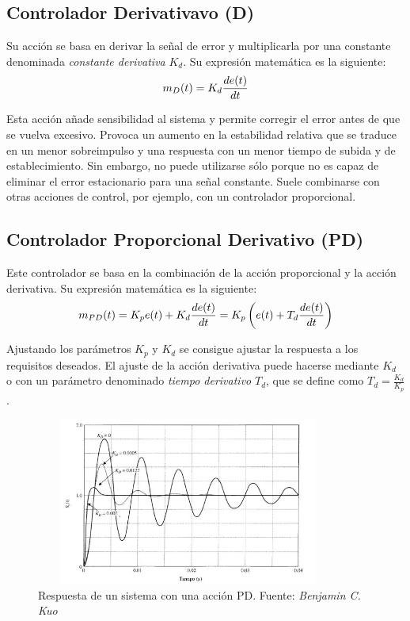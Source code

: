 \subsection{Controlador Derivativavo (D)}

	Su acción se basa en derivar la señal de error y multiplicarla por una constante denominada \textit{constante derivativa} $K_{d}$. Su expresión matemática es la siguiente:
\begin{equation}\label{ecuacion2_4}
\normalsize m_{D}(t) = K_{d}\frac{de(t)}{dt}
\end{equation}

	Esta acción añade sensibilidad al sistema y permite corregir el error antes de que se vuelva excesivo. Provoca un aumento en la estabilidad relativa que se traduce en un menor sobreimpulso y una respuesta con un menor tiempo de subida y de establecimiento. Sin embargo, no puede utilizarse sólo porque no es capaz de eliminar el error estacionario para una señal constante.  Suele combinarse con otras acciones de control, por ejemplo, con un controlador proporcional.

\subsection{Controlador Proporcional Derivativo (PD)}

	Este controlador se basa en la combinación de la acción proporcional y la acción derivativa. Su expresión matemática es la siguiente:
\begin{equation}\label{ecuacion2_5}
\normalsize m_{PD}(t) =K_{p}e(t) + K_{d}\frac{de(t)}{dt} = K_{p}\left( e(t) + T_{d}\frac{de(t)}{dt}\right)
\end{equation}

	Ajustando los parámetros $K_{p}$ y $K_{d}$ se consigue ajustar la respuesta a los requisitos deseados. El ajuste de la acción derivativa puede hacerse mediante $K_{d}$ o con un parámetro denominado \textit{tiempo derivativo} $T_{d}$, que se define como $T_{d}=\frac{K_{d}}{K_{p}}$.

\begin{figure}[htbp]
\centering
\includegraphics[width=100mm,height=55mm]{imagenes/capitulo2/2_3_3_PD}
\caption {Respuesta de un sistema con una acción PD. Fuente: \textit{Benjamin C. Kuo}\cite{control2}}
\label{fig2_3_3:PD}
\end{figure}
	
